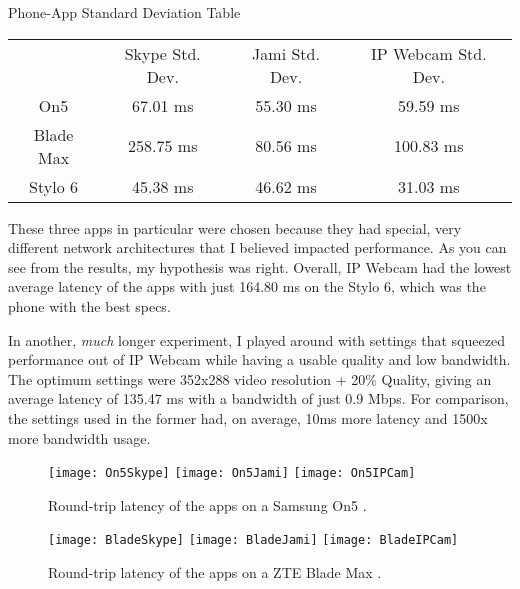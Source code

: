 \begin{centering}
Phone-App Standard Deviation Table\\[0.5cm]

\begin{tabular}{c|c|c|c}
    & Skype Std. Dev. & Jami Std. Dev. & IP Webcam Std. Dev. \\[0.5cm]
    On5 & 67.01 ms & 55.30 ms & 59.59 ms \\[0.5cm]
    Blade Max & 258.75 ms & 80.56 ms & 100.83 ms \\[0.5cm]
    Stylo 6 & 45.38 ms & 46.62 ms & 31.03 ms
\end{tabular} \newline

\end{centering}

These three apps in particular were chosen because they had special, very different network architectures that I believed impacted performance. As you can see from the results, my hypothesis was right. Overall, IP Webcam had the lowest average latency of the apps with just 164.80 ms on the Stylo 6, which was the phone with the best specs.

In another, \textit{much} longer experiment, I played around with settings that squeezed performance out of IP Webcam while having a usable quality and low bandwidth. The optimum settings were 352x288 video resolution + 20\% Quality, giving an average latency of 135.47 ms with a bandwidth of just 0.9 Mbps. For comparison, the settings used in the former had, on average, 10ms more latency and 1500x more bandwidth usage.


\begin{figure}[!htb]
    \centering
    \texttt{[image: On5Skype]}
    \texttt{[image: On5Jami]}
    \texttt{[image: On5IPCam]}
    \caption{
        Round-trip latency of the apps on a Samsung On5 \cite{On5}.
    }
\end{figure}

\begin{figure}[!htb]
    \centering
    \texttt{[image: BladeSkype]}
    \texttt{[image: BladeJami]}
    \texttt{[image: BladeIPCam]}
    \caption{
        Round-trip latency of the apps on a ZTE Blade Max \cite{BladeMax}.
    }
\end{figure}

